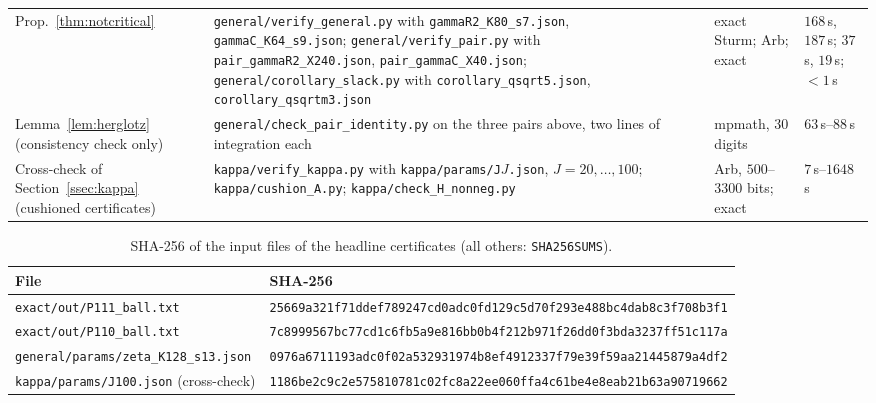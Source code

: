 \begin{table}[ht]
\begin{tabular}{@{}>{\raggedright\arraybackslash}p{}>{\raggedright\arraybackslash}p{}>{\raggedright\arraybackslash}p{}>{\raggedright\arraybackslash}p{}@{}}
Prop.~\ref{thm:notcritical} & \nolinkurl{general/verify_general.py} with \nolinkurl{gammaR2_K80_s7.json}, \nolinkurl{gammaC_K64_s9.json};
\nolinkurl{general/verify_pair.py} with \nolinkurl{pair_gammaR2_X240.json}, \nolinkurl{pair_gammaC_X40.json};
\nolinkurl{general/corollary_slack.py} with \nolinkurl{corollary_qsqrt5.json}, \nolinkurl{corollary_qsqrtm3.json} & exact Sturm;
Arb; exact & $168$\,s, $187$\,s; $37$\,s, $19$\,s; $<1$\,s \\
Lemma~\ref{lem:herglotz} (consistency check only) & \nolinkurl{general/check_pair_identity.py} on the three pairs above,
two lines of integration each & mpmath, $30$ digits & $63$\,s--$88$\,s \\
Cross-check of Section~\ref{ssec:kappa} (cushioned certificates) & \nolinkurl{kappa/verify_kappa.py} with
\nolinkurl{kappa/params/J}$J$\nolinkurl{.json}, $J=20,\dots,100$; \nolinkurl{kappa/cushion_A.py}; \nolinkurl{kappa/check_H_nonneg.py} & Arb,
$500$--$3300$ bits; exact & $7$\,s--$1648$\,s \\
\bottomrule
\end{tabular}
\end{table}

\begin{table}[ht]
\centering\scriptsize
\caption{SHA-256 of the input files of the headline certificates (all others: \texttt{SHA256SUMS}).}\label{tab:anc-hashes}
\begin{tabular}{@{}ll@{}}
\toprule
File & SHA-256 \\
\midrule
\nolinkurl{exact/out/P111_ball.txt} & \texttt{25669a321f71ddef789247cd0adc0fd129c5d70f293e488bc4dab8c3f708b3f1} \\
\nolinkurl{exact/out/P110_ball.txt} & \texttt{7c8999567bc77cd1c6fb5a9e816bb0b4f212b971f26dd0f3bda3237ff51c117a} \\
\nolinkurl{general/params/zeta_K128_s13.json} & \texttt{0976a6711193adc0f02a532931974b8ef4912337f79e39f59aa21445879a4df2} \\
\nolinkurl{kappa/params/J100.json} (cross-check) & \texttt{1186be2c9c2e575810781c02fc8a22ee060ffa4c61be4e8eab21b63a90719662} \\
\bottomrule
\end{tabular}
\end{table}

